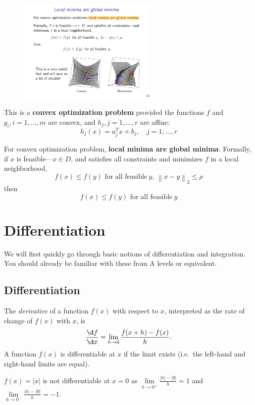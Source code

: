 \documentclass[a4paper]{article}
\begin{document}
{\begin{figure}[htbp] 
  \centering 
  \includegraphics[width=0.6\textwidth]{img/convex_vs_nonconvex.pdf} 
\end{figure}

This is a \textbf{convex optimization problem} provided the functions $f$ and $g_i, i=1,\ldots,m$ are convex, and  $h_j, j=1,\ldots,r$ are affine:
\[
    h_j (x) = a_{j}^{T}x + b_j, \quad j =1,\ldots,r
\]

For convex optimization problem, \textbf{local minima are global minima}.
Formally, if $x$ is feasible---$x \in D$, and satisfies all constraints and minimizes $f$ in a local neighborhood,
\[
    f(x) \leq f(y) \text{\ for \ all \ feasible} \ y, \ \left\lVert x -y \right\rVert_2 \leq \rho
\]
then
\[
    f(x) \leq f(y) \text{\ for \ all \ feasible} \ y
\]

\section{Differentiation}
We will first quickly go through basic notions of differentiation and integration. You should already be familiar with these from A levels or equivalent.

\subsection{Differentiation}
\begin{defi}
  The \emph{derivative} of a function $f(x)$ with respect to $x$, interpreted as the rate of change of $f(x)$ with $x$, is
  \[
    \frac{\d f}{\d x} = \lim_{h\to 0} \frac{f(x + h) - f(x)}{h}.
  \]
  A function $f(x)$ is differentiable at $x$ if the limit exists (i.e.\ the left-hand and right-hand limits are equal).
\end{defi}

\begin{eg}
  $f(x)=|x|$ is not differentiable at $x = 0$ as $\lim\limits_{h\to 0^+} \frac{|h| - |0|}{h}= 1$ and $\lim\limits_{h\to 0^-} \frac{|h| - |0|}{h}= -1$.
\end{eg}

}
\end{document}
